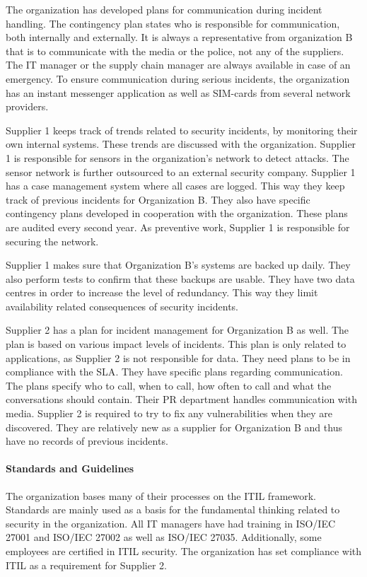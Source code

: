 The organization has developed plans for communication during incident handling. The contingency plan states who is responsible for communication, both internally and externally. It is always a representative from organization B that is to communicate with the media or the police, not any of the suppliers. The IT manager or the supply chain manager are always available in case of an emergency. To ensure communication during serious incidents, the organization has an instant messenger application as well as SIM-cards from several network providers. 

Supplier 1 keeps track of trends related to security incidents, by monitoring their own internal systems. These trends are discussed with the organization. Supplier 1 is responsible for sensors in the organization's network to detect attacks. The sensor network is further outsourced to an external security company. Supplier 1 has a case management system where all cases are logged. This way they keep track of previous incidents for Organization B. They also have specific contingency plans developed in cooperation with the organization. These plans are audited every second year. As preventive work, Supplier 1 is responsible for securing the network.

Supplier 1 makes sure that Organization B's systems are backed up daily. They also perform tests to confirm that these backups are usable. They have two data centres in order to increase the level of redundancy. This way they limit availability related consequences of security incidents.

Supplier 2 has a plan for incident management for Organization B as well. The plan is based on various impact levels of incidents. This plan is only related to applications, as Supplier 2 is not responsible for data. They need plans to be in compliance with the \ac{SLA}. They have specific plans regarding communication. The plans specify who to call, when to call, how often to call and what the conversations should contain. Their PR department handles communication with media. Supplier 2 is required to try to fix any vulnerabilities when they are discovered. They are relatively new as a supplier for Organization B and thus have no records of previous incidents.

\paragraph{Standards and Guidelines}
The organization bases many of their processes on the ITIL framework. Standards are mainly used as a basis for the fundamental thinking related to security in the organization. All IT managers have had training in ISO/IEC 27001 and ISO/IEC 27002 as well as ISO/IEC 27035. Additionally, some employees are certified in ITIL security. The organization has set compliance with \ac{ITIL} as a requirement for Supplier 2. %

